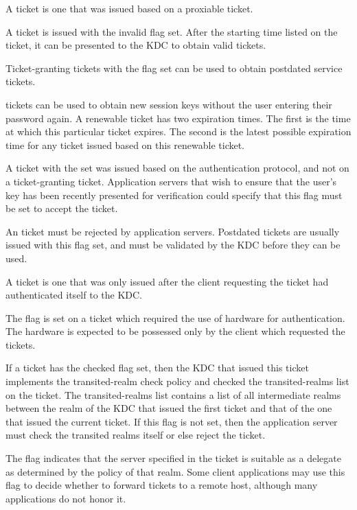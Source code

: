 \documentclass[letterpaper,10pt,english]{sphinxmanual}
\begin{document}
A  ticket is one that was issued based on a proxiable ticket.

A  ticket is issued with the invalid flag set.  After the
starting time listed on the ticket, it can be presented to the KDC to
obtain valid tickets.

Ticket-granting tickets with the  flag set can be used
to obtain postdated service tickets.

 tickets can be used to obtain new session keys without
the user entering their password again.  A renewable ticket has two
expiration times.  The first is the time at which this particular
ticket expires.  The second is the latest possible expiration time for
any ticket issued based on this renewable ticket.

A ticket with the  set was issued based on the
authentication protocol, and not on a ticket-granting ticket.
Application servers that wish to ensure that the user’s key has been
recently presented for verification could specify that this flag must
be set to accept the ticket.

An  ticket must be rejected by application servers.
Postdated tickets are usually issued with this flag set, and must be
validated by the KDC before they can be used.

A  ticket is one that was only issued after the
client requesting the ticket had authenticated itself to the KDC.

The  flag is set on a ticket which required
the use of hardware for authentication.  The hardware is expected to
be possessed only by the client which requested the tickets.

If a ticket has the  checked flag set, then the KDC
that issued this ticket implements the transited-realm check policy
and checked the transited-realms list on the ticket.  The
transited-realms list contains a list of all intermediate realms
between the realm of the KDC that issued the first ticket and that of
the one that issued the current ticket.  If this flag is not set, then
the application server must check the transited realms itself or else
reject the ticket.

The  flag indicates that the server specified in
the ticket is suitable as a delegate as determined by the policy of
that realm.  Some client applications may use this flag to decide
whether to forward tickets to a remote host, although many
applications do not honor it.
\end{document}
